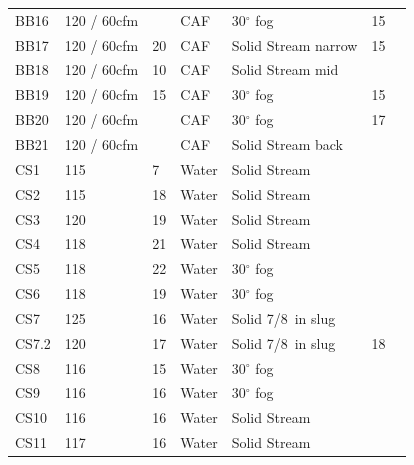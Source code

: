\documentclass[12pt,oneside]{book}
\begin{document}
\begin{table}[!ht]
\begin{tabular}{lllllll}
BB16       &   120 / 60cfm      &               & CAF    &  30$^{\circ}$ fog   & 15                 &          \\
BB17       &   120 / 60cfm      & 20            & CAF    &  Solid Stream narrow & 15                &          \\
BB18       &   120 / 60cfm      & 10            & CAF    &  Solid Stream mid   &                    &          \\
BB19       &   120 / 60cfm      & 15            & CAF    &  30$^{\circ}$ fog   & 15                 &          \\
BB20       &   120 / 60cfm      &               & CAF    &  30$^{\circ}$ fog   & 17                 &          \\
BB21       &   120 / 60cfm      &               & CAF    &  Solid Stream back  &                    &          \\
CS1        &   115              & 7             & Water  &  Solid Stream       &                    &          \\
CS2        &   115              & 18            & Water  &  Solid Stream       &                    &          \\
CS3        &   120              & 19            & Water  &  Solid Stream       &                    &          \\
CS4        &   118              & 21            & Water  &  Solid Stream       &                    &          \\
CS5        &   118              & 22            & Water  &  30$^{\circ}$ fog   &                    &          \\
CS6        &   118              & 19            & Water  &  30$^{\circ}$ fog   &                    &          \\
CS7        &   125              & 16            & Water  &  Solid 7/8~in slug  &                    &          \\
CS7.2      &   120              & 17            & Water  &  Solid 7/8~in slug  & 18                 &          \\
CS8        &   116              & 15            & Water  &  30$^{\circ}$ fog   &                    &          \\
CS9        &   116              & 16            & Water  &  30$^{\circ}$ fog   &                    &          \\
CS10       &   116              & 16            & Water  &  Solid Stream       &                    &          \\
CS11       &   117              & 16            & Water  &  Solid Stream       &                    &          \\
\bottomrule[1.25pt]
\end{tabular}\par
\end{table}
\end{document}
